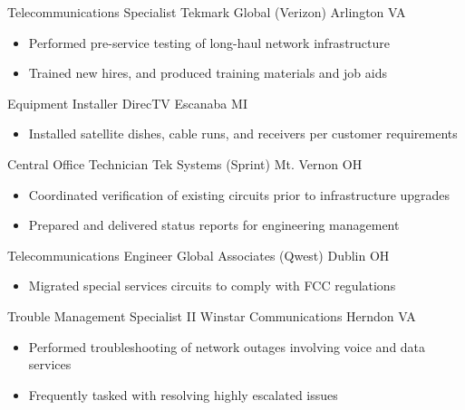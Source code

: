     {Telecommunications Specialist} {Tekmark Global (Verizon)}
    {Arlington}
    {VA}
    {\begin{itemize}
        \item Performed pre-service testing of long-haul network infrastructure
        \item Trained new hires, and produced training materials and job aids
    \end{itemize}}
    {Equipment Installer}
    {DirecTV}
    {Escanaba}
    {MI}
    {\begin{itemize}
        \item Installed satellite dishes, cable runs, and receivers per customer requirements
    \end{itemize}}
    {Central Office Technician}
    {Tek Systems (Sprint)}
    {Mt. Vernon}
    {OH}
    {\begin{itemize}
        \item Coordinated verification of existing circuits prior to infrastructure upgrades
        \item Prepared and delivered status reports for engineering management
    \end{itemize}}
    {Telecommunications Engineer}
    {Global Associates (Qwest)}
    {Dublin}
    {OH}
    {\begin{itemize}
        \item Migrated special services circuits to comply with FCC regulations
    \end{itemize}}
    {Trouble Management Specialist II}
    {Winstar Communications}
    {Herndon}
    {VA}
    {\begin{itemize}
        \item Performed troubleshooting of network outages involving voice and data services
        \item Frequently tasked with resolving highly escalated issues
    \end{itemize}}